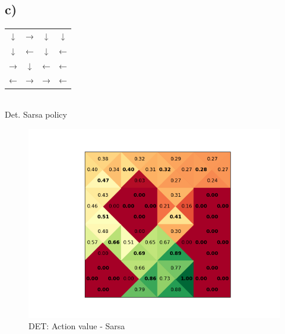 \documentclass[a4paper]{article}
\begin{document}
\newpage
\subsection*{c)}
    \begin{center}
	\begin{tabular}{ c c c c }
		↓ & → & ↓ & ↓ \\
		↓ & ← & ↓ & ← \\
		→ & ↓ & ← & ← \\
		← & → & → & ←  
	\end{tabular} \\\vspace{10pt}
	Det. Sarsa policy 
\end{center}
\begin{figure}[!ht]
	\centering
	\includegraphics[width=0.8\linewidth]{det_action_value_sarsa}
	\caption{DET: Action value - Sarsa}
	\label{fig:action_value_qlearning}
\end{figure}
\end{document}
